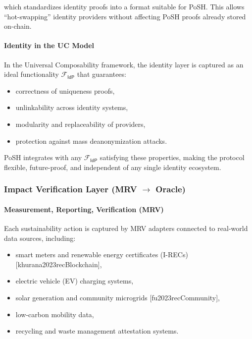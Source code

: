 \documentclass{article}
\begin{document}
which standardizes identity proofs into a format suitable for PoSH. This allows
``hot-swapping'' identity providers without affecting PoSH proofs already stored
on-chain.

\paragraph{Identity in the UC Model}

In the Universal Composability framework, the identity layer is captured as an
ideal functionality $\mathcal{F}_{\textsf{IdP}}$ that guarantees:

\begin{itemize}
\item correctness of uniqueness proofs,
\item unlinkability across identity systems,
\item modularity and replaceability of providers,
\item protection against mass deanonymization attacks.
\end{itemize}

PoSH integrates with any $\mathcal{F}_{\textsf{IdP}}$ satisfying these
properties, making the protocol flexible, future-proof, and independent of any
single identity ecosystem.

\subsubsection{Impact Verification Layer (MRV $\rightarrow$ Oracle)}

\paragraph{Measurement, Reporting, Verification (MRV)}

Each sustainability action is captured by MRV adapters connected to real-world
data sources, including:

\begin{itemize}
\item smart meters and renewable energy certificates (I-RECs) [khurana2023recBlockchain],
\item electric vehicle (EV) charging systems,
\item solar generation and community microgrids [fu2023recCommunity],
\item low-carbon mobility data,
\item recycling and waste management attestation systems.
\end{itemize}
\end{document}
